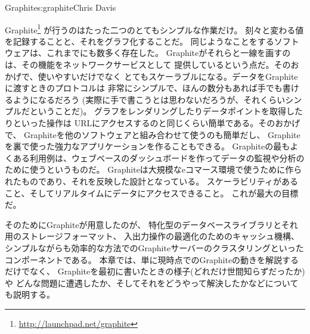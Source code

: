 \begin{aosachapter}{Graphite}{s:graphite}{Chris Davis}

Graphite\footnote{\url{http://launchpad.net/graphite}}
が行うのはたった二つのとてもシンプルな作業だけ。
刻々と変わる値を記録することと、それをグラフ化することだ。
同じようなことをするソフトウェアは、これまでにも数多く存在した。
Graphiteがそれらと一線を画すのは、その機能をネットワークサービスとして
提供しているという点だ。そのおかげで、使いやすいだけでなく
とてもスケーラブルになる。データをGraphiteに渡すときのプロトコルは
非常にシンプルで、ほんの数分もあれば手でも書けるようになるだろう
(実際に手で書こうとは思わないだろうが、それくらいシンプルだということだ)。
グラフをレンダリングしたりデータポイントを取得したりといった操作は
URLにアクセスするのと同じくらい簡単である。そのおかげで、
Graphiteを他のソフトウェアと組み合わせて使うのも簡単だし、
Graphiteを裏で使った強力なアプリケーションを作ることもできる。
Graphiteの最もよくある利用例は、ウェブベースのダッシュボードを作ってデータの監視や分析のために使うというものだ。
Graphiteは大規模なeコマース環境で使うために作られたものであり、それを反映した設計となっている。
スケーラビリティがあること、そしてリアルタイムにデータにアクセスできること。
これが最大の目標だ。

そのためにGraphiteが用意したのが、
特化型のデータベースライブラリとそれ用のストレージフォーマット、
入出力操作の最適化のためのキャッシュ機構、
シンプルながらも効率的な方法でのGraphiteサーバーのクラスタリングといったコンポーネントである。
本章では、単に現時点でのGraphiteの動きを解説するだけでなく、
Graphiteを最初に書いたときの様子(どれだけ世間知らずだったか)や
どんな問題に遭遇したか、そしてそれをどうやって解決したかなどについても説明する。


\end{aosachapter}
